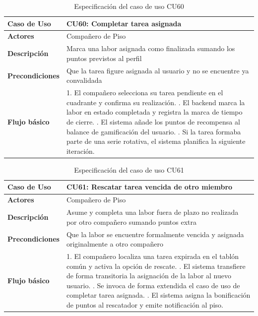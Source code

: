 \begin{table}[H]
\centering
\begin{tabular}{|p{3.2cm}|p{11.3cm}|}
\hline
\textbf{Caso de Uso} & \textbf{CU60: Completar tarea asignada} \\ \hline
\textbf{Actores} & Compañero de Piso \\ \hline
\textbf{Descripción} & Marca una labor asignada como finalizada sumando los puntos previstos al perfil \\ \hline
\textbf{Precondiciones} & Que la tarea figure asignada al usuario y no se encuentre ya convalidada \\ \hline
\textbf{Flujo básico} & 
1. El compañero selecciona su tarea pendiente en el cuadrante y confirma su realización. \newline
2. El backend marca la labor en estado completada y registra la marca de tiempo de cierre. \newline
3. El sistema añade los puntos de recompensa al balance de gamificación del usuario. \newline
4. Si la tarea formaba parte de una serie rotativa, el sistema planifica la siguiente iteración. \\ \hline
\end{tabular}
\caption{Especificación del caso de uso CU60}
\label{tab:cu60}
\end{table}

\begin{table}[H]
\centering
\begin{tabular}{|p{3.2cm}|p{11.3cm}|}
\hline
\textbf{Caso de Uso} & \textbf{CU61: Rescatar tarea vencida de otro miembro} \\ \hline
\textbf{Actores} & Compañero de Piso \\ \hline
\textbf{Descripción} & Asume y completa una labor fuera de plazo no realizada por otro compañero sumando puntos extra \\ \hline
\textbf{Precondiciones} & Que la labor se encuentre formalmente vencida y asignada originalmente a otro compañero \\ \hline
\textbf{Flujo básico} & 
1. El compañero localiza una tarea expirada en el tablón común y activa la opción de rescate. \newline
2. El sistema transfiere de forma transitoria la asignación de la labor al nuevo usuario. \newline
3. Se invoca de forma extendida el caso de uso de completar tarea asignada. \newline
4. El sistema asigna la bonificación de puntos al rescatador y emite notificación al piso. \\ \hline
\end{tabular}
\caption{Especificación del caso de uso CU61}
\label{tab:cu61}
\end{table}

